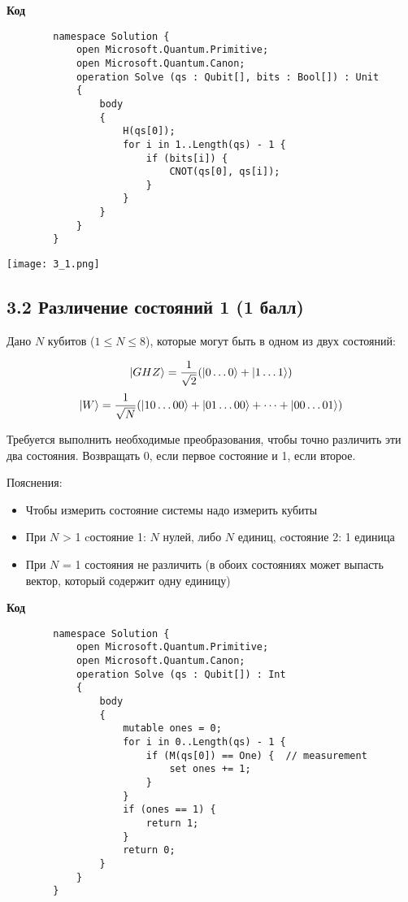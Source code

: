\documentclass{article}
\DeclarePairedDelimiter\ket{\lvert}{\rangle}
\begin{document}
    \textbf{Код}
    
    \begin{lstlisting}
        namespace Solution {
            open Microsoft.Quantum.Primitive;
            open Microsoft.Quantum.Canon;
            operation Solve (qs : Qubit[], bits : Bool[]) : Unit 
            {
                body
                {
                    H(qs[0]);
                    for i in 1..Length(qs) - 1 {
                        if (bits[i]) {
                            CNOT(qs[0], qs[i]);
                        }
                    }
                }
            }
        }
    \end{lstlisting}
    \begin{center}
        \texttt{[image: 3\_1.png]} \\
    \end{center}


\newpage


\subsection*{3.2 Различение состояний 1 (1 балл)}

    Дано $N$ кубитов ($1 \le N \le 8$), которые могут быть в одном из двух состояний:
    
    $$\ket{GHZ} = \frac{1}{\sqrt2}(\ket{0\dots0} +\ket{1\dots1})$$
    $$\ket{W} = \frac{1}{\sqrt N}(\ket{10\dots00}+\ket{01\dots00} + \dots +\ket{00\dots01})$$
    
    Требуется выполнить необходимые преобразования, чтобы точно различить эти два состояния. Возвращать $0$, если первое состояние и 1, если второе. 
    
    Пояснения:
        
    \begin{itemize}
        \item Чтобы измерить состояние системы надо измерить кубиты
        \item При $N$ > 1 cостояние 1: $N$ нулей, либо $N$ единиц, cостояние 2: 1 единица
        \item При $N$ = 1 состояния не различить (в обоих состояниях может выпасть вектор, который содержит одну единицу)

    \end{itemize}
    
    \textbf{Код}

    \begin{lstlisting}
        namespace Solution {
            open Microsoft.Quantum.Primitive;
            open Microsoft.Quantum.Canon;
            operation Solve (qs : Qubit[]) : Int 
            {
                body
                {
                    mutable ones = 0;
                    for i in 0..Length(qs) - 1 {
                        if (M(qs[0]) == One) {  // measurement
                            set ones += 1;
                        }
                    }
                    if (ones == 1) {
                        return 1;
                    }
                    return 0;
                }
            }
        }
    \end{lstlisting}
 
\end{document}
